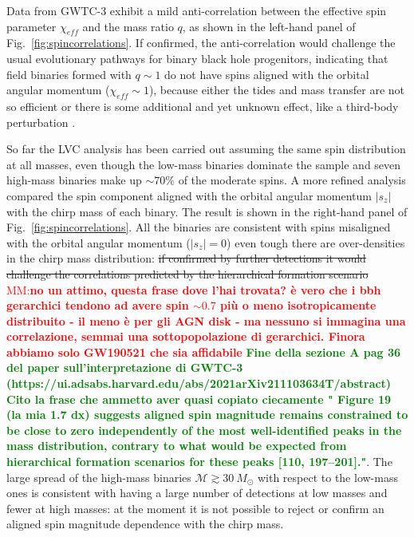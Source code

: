 \documentclass[a4paper,titlepage]{book}     	%
\newcommand{\sun}{\ensuremath{_\odot}}
\newcommand{\msun}{\ensuremath{M\sun}}
\newcommand{\micmap}[1]{\textcolor{red}{MM:\bf#1}}
\newcommand{\erika}[1]{\textcolor{green}{\bf#1}}
\begin{document}
Data from GWTC-3 exhibit a mild anti-correlation between the effective spin parameter $\chi_{eff}$ and the mass ratio $q$, as shown in the left-hand panel of Fig.\ \ref{fig:spincorrelations}. If confirmed, the anti-correlation would challenge the usual evolutionary pathways for binary black hole progenitors, indicating that field binaries formed with $q \sim 1$ do not have spins aligned with the orbital angular momentum ($\chi_{eff} \sim 1$),  because either the tides and mass transfer are not so efficient or there is some additional and yet unknown effect, like a third-body perturbation \cite{misalignedbinary}.


So far the LVC analysis has been carried out assuming the same spin distribution at all masses, even though the low-mass binaries dominate the sample and seven high-mass binaries make up $\sim 70 \%$ of the moderate spins. A more refined analysis compared the spin component aligned with the orbital angular momentum $|s_z|$ with the chirp mass of each binary. The result is shown in the right-hand panel of Fig.\ \ref{fig:spincorrelations}. All the binaries are consistent with spins misaligned with the orbital angular momentum ($|s_z| = 0$) even tough there are over-densities in the chirp mass distribution: \st{if confirmed by further detections it would challenge the correlations predicted by the hierarchical formation scenario} \micmap{no un attimo, questa frase dove l'hai trovata? è vero che i bbh gerarchici tendono ad avere spin $\sim{0.7}$ più o meno isotropicamente distribuito - il meno è per gli AGN disk - ma nessuno si immagina una correlazione, semmai una sottopopolazione di gerarchici. Finora abbiamo solo GW190521 che sia affidabile} \erika{Fine della sezione A pag 36 del paper sull'interpretazione di GWTC-3  (https://ui.adsabs.harvard.edu/abs/2021arXiv211103634T/abstract) Cito la frase che ammetto aver quasi copiato ciecamente " Figure 19 (la mia 1.7 dx) suggests aligned spin magnitude remains constrained to be close to zero independently of the most well-identified peaks in the mass distribution, contrary to what would be expected from hierarchical formation scenarios for these peaks [110, 197–201]."}. The large spread of the high-mass binaries $\mathcal{M} \gtrsim 30~\msun$ with respect to the low-mass ones is consistent with having a large number of detections at low masses and fewer at high masses: at the moment it is not possible to reject or confirm an aligned spin magnitude dependence with the chirp mass.
\end{document}
